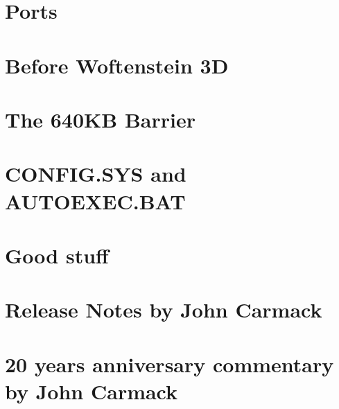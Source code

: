 \documentclass[8pt]{book}
\begin{document}
    \chapter{Ports}        
        
        
    \chapter{Before Woftenstein 3D}
        
    \appendix
    \appendixpage

    \chapter{The 640KB Barrier}\label{chap:barrier640}
        
    \chapter{CONFIG.SYS and AUTOEXEC.BAT}
         
    \chapter{Good stuff}
          
    \chapter{Release Notes by John Carmack}
        
    \chapter{20 years anniversary commentary by John Carmack}
        

    
    \cleartoleftpage %
    
    \blankpage
    \blankpage
\end{document}
